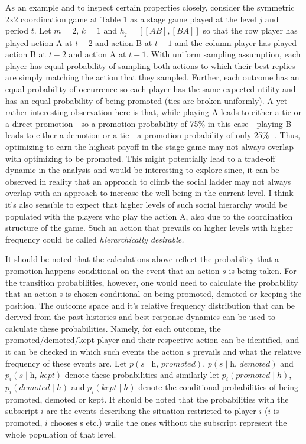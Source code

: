\documentclass[11pt, a4paper, leqno]{article}
\begin{document}
As an example and to inspect certain properties closely, consider the symmetric 2x2 coordination game at Table 1 as a stage game played at the level $j$ and period $t$. Let $m=2$, $k=1$ and $h_j=[[AB],[BA]]$ so that the row player has played action A at $t-2$ and action B at $t-1$ and the column player has played action B at $t-2$ and action A at $t-1$. With uniform sampling assumption, each player has equal probability of sampling both actions to which their best replies are simply matching the action that they sampled. Further, each outcome has an equal probability of occurrence so each player has the same expected utility and has an equal probability of being promoted (ties are broken uniformly). A yet rather interesting observation here is that, while playing A leads to either a tie or a direct promotion - so a promotion probability of 75\% in this case - playing B leads to either a demotion or a tie - a promotion probability of only 25\% -. Thus, optimizing to earn the highest payoff in the stage game may not always overlap with optimizing to be promoted. This might potentially lead to a trade-off dynamic in the analysis and would be interesting to explore since, it can be observed in reality that an approach to climb the social ladder may not always overlap with an approach to increase the well-being in the current level. I think it's also sensible to expect that higher levels of such social hierarchy would be populated with the players who play the action A, also due to the coordination structure of the game. Such an action that prevails on higher levels with higher frequency could be called \textit{hierarchically desirable.}

It should be noted that the calculations above reflect the probability that a promotion happens conditional on the event that an action $s$ is being taken. For the transition probabilities, however, one would need to calculate the probability that an action s is chosen conditional on being promoted, demoted or keeping the position. The outcome space and it's relative frequency distribution that can be derived from the past histories and best response dynamics can be used to calculate these probabilities. Namely, for each outcome, the promoted/demoted/kept player and their respective action can be identified, and it can be checked in which such events the action $s$ prevails and what the relative frequency of these events are. Let 
$p(s \mid \textit{h, promoted})$, $p(s\mid \textit{h, demoted})$ and $p_i(s \mid \textit{h, kept})$ denote these probabilities and similarly let $p_i(promoted\mid h)$, $p_i(demoted\mid h)$ and $p_i(kept\mid h)$ denote the conditional probabilities of being promoted, demoted or kept. It should be noted that the probabilities with the subscript $i$ are the events describing the situation restricted to player $i$ ($i$ is promoted, $i$ chooses s etc.) while the ones without the subscript represent the whole population of that level.
\end{document}

